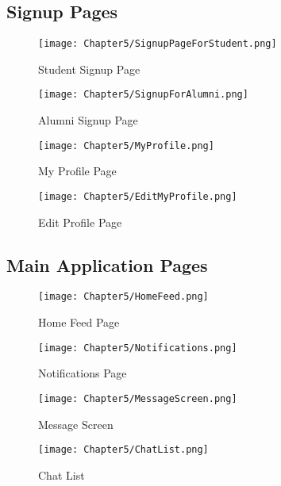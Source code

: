 \documentclass[12pt, a4paper]{report}
\begin{document}
\subsection{Signup Pages}
\begin{figure}[htbp]
    \centering
    \begin{minipage}[b]{0.35\linewidth}
        \centering
        \texttt{[image: Chapter5/SignupPageForStudent.png]}
        \caption{Student Signup Page}
        \label{fig:student-signup}
    \end{minipage}
    \hfill
    \begin{minipage}[b]{0.35\linewidth}
        \centering
        \texttt{[image: Chapter5/SignupForAlumni.png]}
        \caption{Alumni Signup Page}
        \label{fig:alumni-signup}
    \end{minipage}
    \hfill
    \begin{minipage}[b]{0.35\linewidth}
        \centering
        \texttt{[image: Chapter5/MyProfile.png]}
        \caption{My Profile Page}
        \label{fig:my-profile}
    \end{minipage}
    \hfill
    \begin{minipage}[b]{0.35\linewidth}
        \centering
        \texttt{[image: Chapter5/EditMyProfile.png]}
        \caption{Edit Profile Page}
        \label{fig:edit-profile}
    \end{minipage}
\end{figure}

\subsection{Main Application Pages}
\begin{figure}[htbp]
    \centering
    \begin{minipage}[b]{0.35\linewidth}
        \centering
        \texttt{[image: Chapter5/HomeFeed.png]}
        \caption{Home Feed Page}
        \label{fig:home-feed}
    \end{minipage}
    \hfill
    \begin{minipage}[b]{0.35\linewidth}
        \centering
        \texttt{[image: Chapter5/Notifications.png]}
        \caption{Notifications Page}
        \label{fig:notifications}
    \end{minipage}
    \hfill
    \begin{minipage}[b]{0.35\linewidth}
        \centering
        \texttt{[image: Chapter5/MessageScreen.png]}
        \caption{Message Screen}
        \label{fig:message-screen}
    \end{minipage}
    \hfill
    \begin{minipage}[b]{0.35\linewidth}
        \centering
        \texttt{[image: Chapter5/ChatList.png]}
        \caption{Chat List}
        \label{fig:chat-list}
    \end{minipage}
\end{figure}
\end{document}
